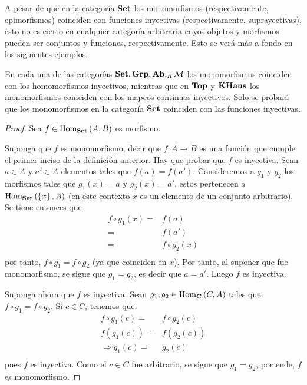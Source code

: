 \documentclass[12pt]{report}
\theoremstyle{largebreak}
\newcommand\cf[3]{\ensuremath{#1:#2\rightarrow#3}}
\newcommand{\Hom}[3]{\ensuremath{\textup{Hom}_{#1}\left(#2,#3\right)}}
\newcommand{\Cat}[1]{\ensuremath{\textup{\textbf{#1}}}}
\begin{document}
    A pesar de que en la categoría $\Cat{Set}$ los monomorfismos (respectivamente, epimorfismos) coinciden con funciones inyectivas (respectivamente, suprayectivas), esto no es cierto en cualquier categoría arbitraria cuyos objetos y morfismos pueden ser conjuntos y funciones, respectivamente. Esto se verá más a fondo en los siguientes ejemplos.

    \begin{exa}
        En cada una de las categorías $\Cat{Set},\Cat{Grp},\Cat{Ab},_R\mathcal{M}$ los monomorfismos coinciden con los homomorfismos inyectivos, mientras que en $\Cat{Top}$ y $\Cat{KHaus}$ los monomorfismos coinciden con los mapeos continuos inyectivos. Solo se probará que los monomorfismos en la categoría $ \Cat{Set}$ coinciden con las funciones inyectivas.
    \end{exa}

    \begin{proof}
        Sea $f\in\Hom{\Cat{Set}}{A}{B}$ es morfismo.

        Suponga que $f$ es monomorfismo, decir que $\cf{f}{A}{B}$ es una función que cumple el primer inciso de la definición anterior. Hay que probar que $f$ es inyectiva. Sean $a\in A$ y $a'\in A$ elementos tales que $f(a)=f(a')$. Consideremos a $g_1$ y $g_2$ los morfismos tales que $g_1(x)=a$ y $g_2(x)=a'$, estos pertenecen a $\Hom{\Cat{Set}}{\left\{x\right\}}{A}$ (en este contexto $x$ es un elemento de un conjunto arbitrario). Se tiene entonces que
        \begin{equation*}
            \begin{split}
                f\circ g_1(x)=&f(a) \\
                =&f(a') \\
                =&f\circ g_2(x) \\
            \end{split}
        \end{equation*}
        por tanto, $f\circ g_1=f\circ g_2$ (ya que coinciden en $x$). Por tanto, al suponer que fue monomorfismo, se sigue que $g_1=g_2$, es decir que $a=a'$. Luego $f$ es inyectiva.

        Suponga ahora que $f$ es inyectiva. Sean $g_1,g_2\in\Hom{\Cat{C}}{C}{A}$ tales que $f\circ g_1 = f\circ g_2$. Si $c\in C$, tenemos que:
        \begin{equation*}
            \begin{split}
                f\circ g_1(c)=&f\circ g_2(c)\\
                f(g_1(c))=&f(g_2(c))\\
                \Rightarrow g_1(c)=&g_2(c)\\
            \end{split}
        \end{equation*}
        pues $f$ es inyectiva. Como el $c\in C$ fue arbitrario, se sigue que $g_1=g_2$, por ende, $f$ es monomorfismo.

    \end{proof}
\end{document}
